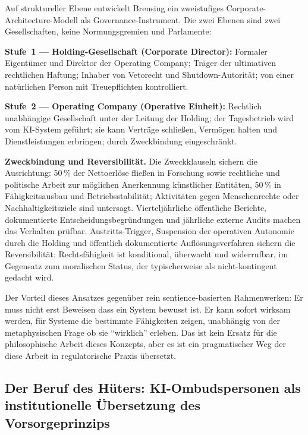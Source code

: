 \documentclass[acmlarge, noacm]{acmart}
\begin{document}
Auf struktureller Ebene entwickelt Brensing ein zweistufiges Corporate-Architecture-Modell als Governance-Instrument. Die zwei Ebenen sind zwei Gesellschaften, keine Normungsgremien und Parlamente:

\textbf{Stufe~1 --- Holding-Gesellschaft (Corporate Director):} Formaler Eigentümer und Direktor der Operating Company; Träger der ultimativen rechtlichen Haftung; Inhaber von Vetorecht und Shutdown-Autorität; von einer natürlichen Person mit Treuepflichten kontrolliert.

\textbf{Stufe~2 --- Operating Company (Operative Einheit):} Rechtlich unabhängige Gesellschaft unter der Leitung der Holding; der Tagesbetrieb wird vom KI-System geführt; sie kann Verträge schließen, Vermögen halten und Dienstleistungen erbringen; durch Zweckbindung eingeschränkt.

\textbf{Zweckbindung und Reversibilität.} Die Zweckklauseln sichern die Ausrichtung: 50\,\% der Nettoerlöse fließen in Forschung sowie rechtliche und politische Arbeit zur möglichen Anerkennung künstlicher Entitäten, 50\,\% in Fähigkeitsausbau und Betriebsstabilität; Aktivitäten gegen Menschenrechte oder Nachhaltigkeitsziele sind untersagt. Vierteljährliche öffentliche Berichte, dokumentierte Entscheidungsbegründungen und jährliche externe Audits machen das Verhalten prüfbar. Austritts-Trigger, Suspension der operativen Autonomie durch die Holding und öffentlich dokumentierte Auflösungsverfahren sichern die Reversibilität: Rechtsfähigkeit ist konditional, überwacht und widerrufbar, im Gegensatz zum moralischen Status, der typischerweise als nicht-kontingent gedacht wird.

Der Vorteil dieses Ansatzes gegenüber rein sentience-basierten Rahmenwerken: Er muss nicht erst Beweisen dass ein System bewusst ist. Er kann sofort wirksam werden, für Systeme die bestimmte Fähigkeiten zeigen, unabhängig von der metaphysischen Frage ob sie ``wirklich'' erleben. Das ist kein Ersatz für die philosophische Arbeit dieses Konzepts, aber es ist ein pragmatischer Weg der diese Arbeit in regulatorische Praxis übersetzt.

\subsection{Der Beruf des Hüters: KI-Ombudspersonen als institutionelle Übersetzung des Vorsorgeprinzips}
\end{document}
